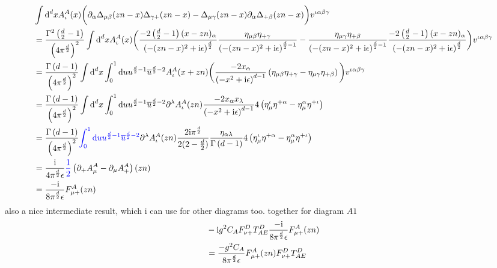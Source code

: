 \begin{align}
	&\int \text{d} ^d x A_\iota^A(x) \bigg( \partial_\alpha\Delta_{\mu \beta}(zn-x) \Delta_{\gamma +} (zn -x) - \Delta_{\mu \gamma}(zn-x) \partial_{\alpha}\Delta_{+\beta}(zn-x) \bigg) v^{\iota\alpha\beta\gamma}
	\\
	&=
	\frac{\Gamma^2\left(\frac{d}{2}-1\right)}{\left(4\pi^{\frac{d}{2}}\right)^2}\int \text{d} ^d x A_\iota^A(x) \bigg(
	\frac{-2\left(\frac{d}{2}-1\right)(x-zn)_\alpha} {\left(-(zn-x)^2+\text{i}\epsilon\right)^{\frac{d}{2}}}
	\frac{\eta_{\mu \beta}\eta_{+\gamma}} {\left(-(zn-x)^2+\text{i}\epsilon\right)^{\frac{d}{2}-1}}
	- 
	\frac{\eta_{\mu \gamma}\eta_{+\beta}} {\left(-(zn-x)^2+\text{i}\epsilon\right)^{\frac{d}{2}-1}}
	\frac{-2\left(\frac{d}{2}-1\right)(x-zn)_\alpha} {\left(-(zn-x)^2+\text{i}\epsilon\right)^{\frac{d}{2}}}
	 \bigg) v^{\iota\alpha\beta\gamma}
	\\
	&=
	\frac{\Gamma\left(d-1\right)}{\left(4\pi^{\frac{d}{2}}\right)^2}\int \text{d} ^d x \int _0^1 \text{d} u u^{\frac{d}{2}-1} \overline u^{\frac{d}{2}-2}A_\iota^A(x+zn) \bigg(
	\frac{-2 x_\alpha} {\left(-x^2+\text{i}\epsilon\right)^{d-1}}
	\left(\eta_{\mu \beta}\eta_{+\gamma}-\eta_{\mu \gamma}\eta_{+\beta} \right)
	\bigg) v^{\iota\alpha\beta\gamma}
	\\
	&=
	\frac{\Gamma\left(d-1\right)}{\left(4\pi^{\frac{d}{2}}\right)^2}\int \text{d} ^d x \int _0^1 \text{d} u u^{\frac{d}{2}-1} \overline u^{\frac{d}{2}-2} \partial^\lambda A_\iota^A(zn) \frac{-2 x_\alpha x_\lambda} {\left(-x^2+\text{i}\epsilon\right)^{d-1}}
	4\left(\eta_{\mu}^\iota \eta^{+\alpha}-\eta_{\mu}^\alpha \eta^{+\iota} \right)
	\\
	&=
	\frac{\Gamma\left(d-1\right)}{\left(4\pi^{\frac{d}{2}}\right)^2} {\color{blue}\int _0^1 \text{d} u u^{\frac{d}{2}-1} \overline u^{\frac{d}{2}-2}} \partial^\lambda A_\iota^A(zn) \frac{2\text{i} \pi^{\frac{d}{2}}}{2(2-\frac{d}{2})}\frac{\eta_{\alpha\lambda}}{\Gamma\left(d-1\right)}
	4\left(\eta_{\mu}^\iota \eta^{+\alpha}-\eta_{\mu}^\alpha \eta^{+\iota} \right)
	\\
	&=
	\frac{\text{i}}{4\pi^{\frac{d}{2}}\epsilon} {\color{blue}\frac{1}{2}} 
	\left( \partial_+ A_\mu^A - \partial_\mu A_+^A\right)(zn)
	\\
	&=
	\frac{-\text{i}}{8\pi^{\frac{d}{2}}\epsilon} 
	F_{\mu +}^A(zn)
\end{align}
also a nice intermediate result, which i can use for other diagrams too.
together for diagram $A1$
\begin{align}
	&
	-\text{i} g^2 C_A F_{\nu +} ^D T^D_{AE} \frac{-\text{i}}{8\pi^{\frac{d}{2}}\epsilon} 
	F_{\mu +}^A(zn)
	\\
	&= \frac{- g^2 C_A }{8\pi^{\frac{d}{2}}\epsilon}F_{\mu +}^A(zn)F_{\nu +} ^D T^D_{AE}	
\end{align}
